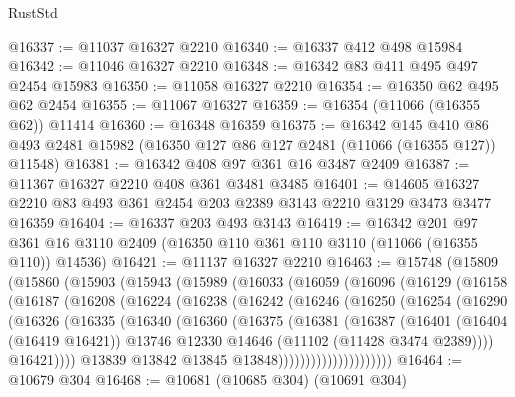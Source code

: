 \begin{lexlean}{RustStd}
\begin{coremodule}
@16337 := @11037 @16327 @2210
@16340 := @16337 @412 @498 @15984
@16342 := @11046 @16327 @2210
@16348 := @16342 @83 @411 @495 @497 @2454 @15983
@16350 := @11058 @16327 @2210
@16354 := @16350 @62 @495 @62 @2454
@16355 := @11067 @16327
@16359 := @16354 (@11066 (@16355 @62)) @11414
@16360 := @16348 @16359
@16375 := @16342
    @145
    @410
    @86
    @493
    @2481
    @15982
    (@16350 @127 @86 @127 @2481 (@11066 (@16355 @127)) @11548)
@16381 := @16342 @408 @97 @361 @16 @3487 @2409
@16387 := @11367 @16327 @2210 @408 @361 @3481 @3485
@16401 := @14605 @16327 @2210 @83 @493 @361 @2454 @203 @2389 @3143 @2210 @3129 @3473 @3477 @16359
@16404 := @16337 @203 @493 @3143
@16419 := @16342
    @201
    @97
    @361
    @16
    @3110
    @2409
    (@16350 @110 @361 @110 @3110 (@11066 (@16355 @110)) @14536)
@16421 := @11137 @16327 @2210
@16463 := @15748
    (@15809
      (@15860
        (@15903
          (@15943
            (@15989
              (@16033
                (@16059
                  (@16096
                    (@16129
                      (@16158
                        (@16187
                          (@16208
                            (@16224
                              (@16238
                                (@16242
                                  (@16246
                                    (@16250
                                      (@16254
                                        (@16290
                                          (@16326
                                            (@16335
                                              (@16340
                                                (@16360
                                                  (@16375
                                                    (@16381
                                                      (@16387
                                                        (@16401
                                                          (@16404 (@16419 @16421))
                                                          @13746
                                                          @12330
                                                          @14646
                                                          (@11102 (@11428 @3474 @2389))))
                                                      @16421))))
                                              @13839
                                              @13842
                                              @13845
                                              @13848)))))))))))))))))))))
@16464 := @10679 @304
@16468 := @10681 (@10685 @304) (@10691 @304)

\end{coremodule}
\end{lexlean}
